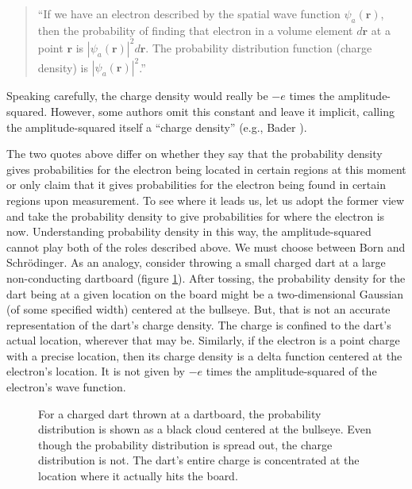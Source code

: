 \documentclass[onecolumn,secnumarabic,amsmath,amssymb,balancelastpage,nofootinbib]{article}
\begin{document}
\begin{quote}
``If we have an electron described by the spatial wave function $\psi_a(\bm{r})$, then the probability of finding that electron in a volume element $d\bm{r}$ at a point $\bm{r}$ is $|\psi_a(\bm{r})|^2 d\bm{r}$.  The probability distribution function (charge density) is $|\psi_a(\bm{r})|^2$.'' \cite[pg.\ 138]{szaboQC}
\end{quote}
Speaking carefully, the charge density would really be $-e$ times the amplitude-squared.  However, some authors omit this constant and leave it implicit, calling the amplitude-squared itself a ``charge density'' (e.g., Bader \cite{bader1990}).

The two quotes above differ on whether they say that the probability density gives probabilities for the electron being located in certain regions at this moment or only claim that it gives probabilities for the electron being found in certain regions upon measurement.  To see where it leads us, let us adopt the former view and take the probability density to give probabilities for where the electron is now.  Understanding probability density in this way, the amplitude-squared cannot play both of the roles described above.  We must choose between Born and Schr\"{o}dinger.  As an analogy, consider throwing a small charged dart at a large non-conducting dartboard (figure \ref{darts}).  After tossing, the probability density for the dart being at a given location on the board might be a two-dimensional Gaussian (of some specified width) centered at the  bullseye.  But, that is not an accurate representation of the dart's charge density.  The charge is confined to the dart's actual location, wherever that may be.  Similarly, if the electron is a point charge with a precise location, then its charge density is a delta function centered at the electron's location.  It is not given by $-e$ times the amplitude-squared of the electron's wave function.

\begin{figure}[htb]
\caption{For a charged dart thrown at a dartboard, the probability distribution is shown as a black cloud centered at the bullseye.  Even though the probability distribution is spread out, the charge distribution is not.  The dart's entire charge is concentrated at the location where it actually hits the board.}
\label{darts}
\end{figure}
\end{document}
